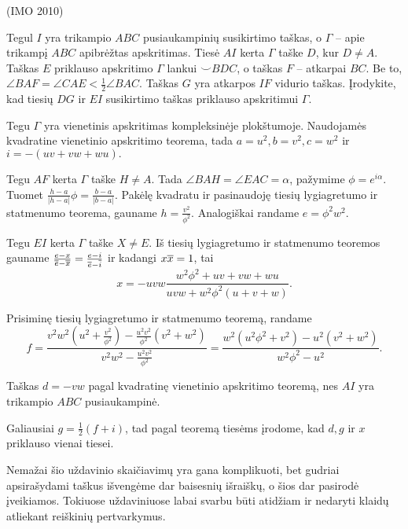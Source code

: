 \documentclass[11pt,a4paper,twoside]{book}
\begin{document}
\begin{pavnr}
(IMO 2010)

Tegul $I$ yra trikampio $ABC$ pusiaukampinių susikirtimo taškas, o $\Gamma$ – apie trikampį $ABC$ apibrėžtas apskritimas. Tiesė $AI$ kerta $\Gamma$ taške $D$, kur $D\ne A$. Taškas $E$ priklauso apskritimo $\Gamma$ lankui $\smile BDC$, o taškas $F$ – atkarpai $BC$. Be to, $\angle BAF = \angle CAE < \frac{1}{2}\angle BAC$. Taškas $G$ yra atkarpos $IF$ vidurio taškas. Įrodykite, kad tiesių $DG$ ir $EI$ susikirtimo taškas priklauso apskritimui $\Gamma$.
\end{pavnr}

\begin{sprendimas}

Tegu $\Gamma$ yra vienetinis apskritimas kompleksinėje plokštumoje. Naudojamės kvadratine vienetinio apskritimo teorema, tada $a=u^2, b=v^2, c=w^2$ ir $i = -(uv+vw+wu).$

Tegu $AF$ kerta $\Gamma$ taške $H\ne A$. Tada $\angle BAH =\angle EAC =\alpha$, pažymime $\phi=e^{i\alpha}$. Tuomet $\frac{h-a}{|h-a|}\phi=\frac{b-a}{|b-a|}.$ Pakėlę kvadratu ir pasinaudoję tiesių lygiagretumo ir statmenumo teorema, gauname $h=\frac{v^2}{\phi^2}$. Analogiškai randame $e=\phi^2w^2$.

Tegu $EI$ kerta $\Gamma$ taške $X \ne E$. Iš tiesių lygiagretumo ir statmenumo teoremos gauname $\frac{e-x}{\overline{e}-\overline{x}}=\frac{e-i}{\overline{e}-\overline{i}}$ ir kadangi $x\overline{x}=1$, tai 
$$x=-uvw\frac{w^2\phi ^2 +uv+vw+wu}{uvw +w^2\phi ^2(u+v+w)}.$$

Prisiminę tiesių lygiagretumo ir statmenumo teoremą, randame 
$$f=\frac{v^2w^2(u^2 + \frac{v^2}{\phi ^2}) - \frac{u^2v^2}{\phi ^2}(v^2+w^2)}{v^2w^2 - \frac{u^2v^2}{\phi ^2}}=\frac{w^2(u^2\phi^2 + v^2) - u^2(v^2+w^2)}{w^2\phi^2 - u^2}.$$

Taškas $d=-vw$ pagal kvadratinę vienetinio apskritimo teoremą, nes $AI$ yra trikampio $ABC$ pusiaukampinė.

Galiausiai $g=\frac{1}{2}(f+i)$, tad pagal teoremą tiesėms įrodome, kad $d, g$ ir $x$ priklauso vienai tiesei.
\end{sprendimas}

Nemažai šio uždavinio skaičiavimų yra gana komplikuoti, bet gudriai apsirašydami taškus išvengėme dar baisesnių išraiškų, o šios dar pasirodė įveikiamos. Tokiuose uždaviniuose labai svarbu būti atidžiam ir nedaryti klaidų atliekant reiškinių pertvarkymus.
\end{document}
